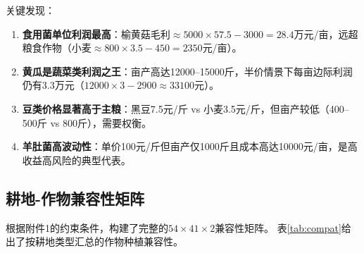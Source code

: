 \documentclass[12pt]{ctexart}
\begin{document}
\noindent 关键发现：
\begin{enumerate}[label=(\arabic*), leftmargin=*]
    \item \textbf{食用菌单位利润最高}：榆黄菇毛利$\approx 5000\times57.5-3000=28.4$万元/亩，远超粮食作物（小麦$\approx 800\times3.5-450=2350$元/亩）。
    \item \textbf{黄瓜是蔬菜类利润之王}：亩产高达12000--15000斤，半价情景下每亩边际利润仍有3.3万元（$12000\times 3 - 2900 \approx 33100$元）。
    \item \textbf{豆类价格显著高于主粮}：黑豆7.5元/斤 vs 小麦3.5元/斤，但亩产较低（400--500斤 vs 800斤），需要权衡。
    \item \textbf{羊肚菌高波动性}：单价100元/斤但亩产仅1000斤且成本高达10000元/亩，是高收益高风险的典型代表。
\end{enumerate}

\subsection{耕地-作物兼容性矩阵}

根据附件1的约束条件，构建了完整的$54\times41\times2$兼容性矩阵。
表\ref{tab:compat}给出了按耕地类型汇总的作物种植兼容性。
\end{document}

